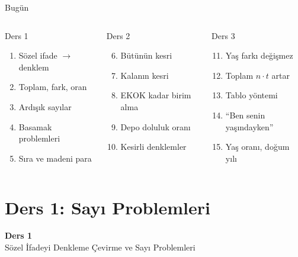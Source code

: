 \documentclass[aspectratio=169,11pt,handout]{beamer}
\begin{document}
\begin{frame}{Bugün}
\begin{columns}[t]
\begin{block}{Ders 1}
\begin{enumerate}
\item Sözel ifade \(\to\) denklem
\item Toplam, fark, oran
\item Ardışık sayılar
\item Basamak problemleri
\item Sıra ve madeni para
\end{enumerate}
\end{block}
\begin{block}{Ders 2}
\begin{enumerate}\setcounter{enumi}{5}
\item Bütünün kesri
\item Kalanın kesri
\item EKOK kadar birim alma
\item Depo doluluk oranı
\item Kesirli denklemler
\end{enumerate}
\end{block}
\begin{block}{Ders 3}
\begin{enumerate}\setcounter{enumi}{10}
\item Yaş farkı değişmez
\item Toplam \(n\cdot t\) artar
\item Tablo yöntemi
\item ``Ben senin yaşındayken''
\item Yaş oranı, doğum yılı
\end{enumerate}
\end{block}
\end{columns}
\end{frame}

\section{Ders 1: Sayı Problemleri}
\begin{frame}
\centering\Large\color{anamavi}\textbf{Ders 1}\\[6pt]\normalsize Sözel İfadeyi Denkleme Çevirme ve Sayı Problemleri
\end{frame}
\end{document}
